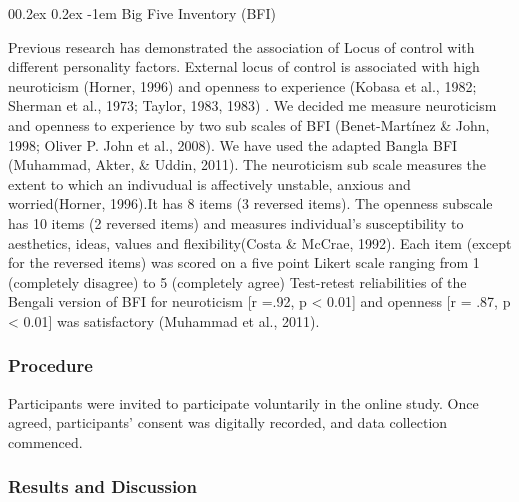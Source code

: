 \documentclass[
  man]{apa6}
\makeatletter
\let\oldparagraph\paragraph
\renewcommand{\paragraph}[1]{\oldparagraph{#1}\mbox{}}
\renewcommand{\paragraph}{\@startsection{paragraph}{4}{\parindent}%
  {0\baselineskip \@plus 0.2ex \@minus 0.2ex}%
  {-1em}%
  {\normalfont\normalsize\bfseries\itshape\typesectitle}}
\makeatother
\begin{document}
\hypertarget{big-five-inventory-bfi}{%
\paragraph{Big Five Inventory (BFI)}\label{big-five-inventory-bfi}}

Previous research has demonstrated the association of Locus of control with different personality factors. External locus of control is associated with high neuroticism (Horner, 1996) and openness to experience (Kobasa et al., 1982; Sherman et al., 1973; Taylor, 1983, 1983) . We decided me measure neuroticism and openness to experience by two sub scales of BFI (Benet-Martínez \& John, 1998; Oliver P. John et al., 2008). We have used the adapted Bangla BFI (Muhammad, Akter, \& Uddin, 2011). The neuroticism sub scale measures the extent to which an indivudual is affectively unstable, anxious and worried(Horner, 1996).It has 8 items (3 reversed items). The openness subscale has 10 items (2 reversed items) and measures individual's susceptibility to aesthetics, ideas, values and flexibility(Costa \& McCrae, 1992). Each item (except for the reversed items) was scored on a five point Likert scale ranging from 1 (completely disagree) to 5 (completely agree) Test-retest reliabilities of the Bengali version of BFI for neuroticism {[}r =.92, p \textless{} 0.01{]} and openness {[}r = .87, p \textless{} 0.01{]} was satisfactory (Muhammad et al., 2011).

\hypertarget{procedure-1}{%
\subsubsection{Procedure}\label{procedure-1}}

Participants were invited to participate voluntarily in the online study. Once agreed, participants' consent was digitally recorded, and data collection commenced.

\hypertarget{results-and-discussion}{%
\subsubsection{Results and Discussion}\label{results-and-discussion}}
\end{document}
